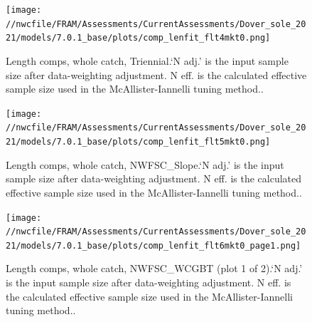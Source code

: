 \documentclass[11pt,
  english,
  a4paper,
]{article}
\begin{document}
\tagmcend\tagstructend


\begin{figure}
\centering
\texttt{[image: //nwcfile/FRAM/Assessments/CurrentAssessments/Dover\_sole\_2021/models/7.0.1\_base/plots/comp\_lenfit\_flt4mkt0.png]}
\caption{Length comps, whole catch, Triennial.`N adj.' is the input sample size after data-weighting adjustment. N eff. is the calculated effective sample size used in the McAllister-Iannelli tuning method..\label{fig:comp_lenfit_flt4mkt0}}
\end{figure}

\tagmcend\tagstructend


\begin{figure}
\centering
\texttt{[image: //nwcfile/FRAM/Assessments/CurrentAssessments/Dover\_sole\_2021/models/7.0.1\_base/plots/comp\_lenfit\_flt5mkt0.png]}
\caption{Length comps, whole catch, NWFSC\_Slope.`N adj.' is the input sample size after data-weighting adjustment. N eff. is the calculated effective sample size used in the McAllister-Iannelli tuning method..\label{fig:comp_lenfit_flt5mkt0}}
\end{figure}

\tagmcend\tagstructend


\begin{figure}
\centering
\texttt{[image: //nwcfile/FRAM/Assessments/CurrentAssessments/Dover\_sole\_2021/models/7.0.1\_base/plots/comp\_lenfit\_flt6mkt0\_page1.png]}
\caption{Length comps, whole catch, NWFSC\_WCGBT (plot 1 of 2).`N adj.' is the input sample size after data-weighting adjustment. N eff. is the calculated effective sample size used in the McAllister-Iannelli tuning method..\label{fig:comp_lenfit_flt6mkt0_page1}}
\end{figure}
\end{document}

